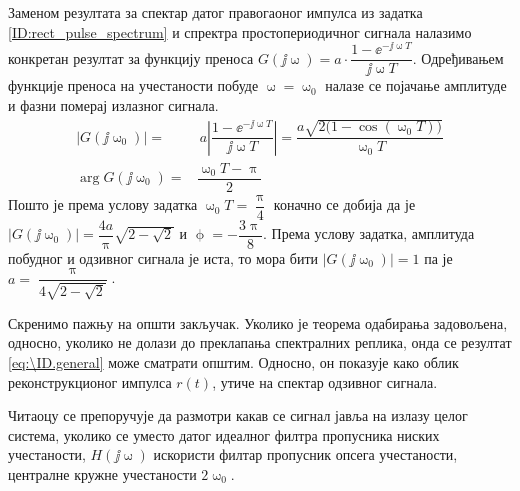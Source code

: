 Заменом резултата за спектар датог правогаоног импулса из задатка \ref{ID:rect_pulse_spectrum}
и спректра простопериодичног сигнала налазимо конкретан резултат за функцију преноса 
${G(\jj\upomega) = a \cdot \dfrac{1 - \ee^{-\jj\upomega T} }{\jj\upomega T}}$. Одређивањем функције преноса на учестаности
побуде $\upomega = \upomega_0$ налазе се појачање амплитуде и фазни померај излазног сигнала.  
\begin{align}
    |G(\jj\upomega_0)| = &\ a \left| \dfrac{1 - \ee^{-\jj\upomega T} }{\jj\upomega T} \right| = 
    \dfrac{ a\sqrt{2\bigl(1 - \cos(\upomega_0 T)\bigr)} }{\upomega_0 T} \\
    \arg G(\jj\upomega_0) = & \dfrac{\upomega_0 T - \uppi}{2} 
\end{align}
Пошто је према услову задатка $\upomega_0 T = \dfrac{\uppi}{4}$ коначно се добија да је 
$|G(\jj\upomega_0)| = \dfrac{4a}{\uppi} \sqrt{2 - \sqrt {2}}$ и $\upphi = -\dfrac{3\uppi}{8}$. Према услову задатка, 
амплитуда побудног и одзивног сигнала је иста, то мора бити $|G(\jj\upomega_0)| = 1$ па је 
$a = \dfrac{\uppi} { 4 \sqrt{2 - \sqrt {2}} }$.

Скренимо пажњу на општи закључак. Уколико је теорема одабирања задовољена, односно, уколико не долази до преклапања 
спектралних реплика, онда се резултат \ref{eq:\ID.general} може сматрати општим. Односно, он показује како облик 
реконструкционог импулса $r(t)$, утиче на спектар одзивног сигнала. 

Читаоцу се препоручује
да размотри какав се сигнал јавља на излазу целог система, уколико се уместо датог идеалног филтра 
пропусника ниских учестаности, $H(\jj\upomega)$ искористи филтар пропусник опсега учестаности, централне кружне учестаности $2 \upomega_0$. 
